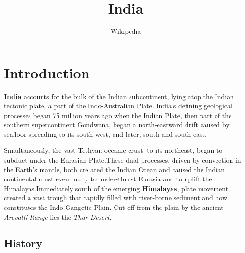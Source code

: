 \documentclass[12pt,a4paper]{article}
\title{India}
\author{Wikipedia}
\begin{document}
\maketitle


\section{Introduction}
\paragraph{}
\textbf{India} accounts for the bulk of the Indian subcontinent, lying atop the
Indian tectonic plate, a part of the Indo-Australian Plate. India’s 
defining geological processes began \underline{75 million }years ago when the Indian Plate, 
then part of the southern supercontinent Gondwana, began a
north-eastward drift caused by seafloor spreading to its south-west, and
later, south and south-east.

\begin{flushleft}
Simultaneously, the vast Tethyan oceanic
crust, to its northeast, began to subduct under the Eurasian Plate.These
dual processes, driven by convection in the Earth’s mantle, both cre
ated the Indian Ocean and caused the Indian continental crust even
tually to under-thrust Eurasia and to uplift the Himalayas.Immediately
south of the emerging \textbf{Himalayas}, plate movement created a vast trough
that rapidly filled with river-borne sediment and now constitutes the
Indo-Gangetic Plain. Cut off from the plain by the ancient \textit{Aravalli
Range} lies the \textit{Thar Desert}.
\end{flushleft}


\subsection{History}
\end{document}
